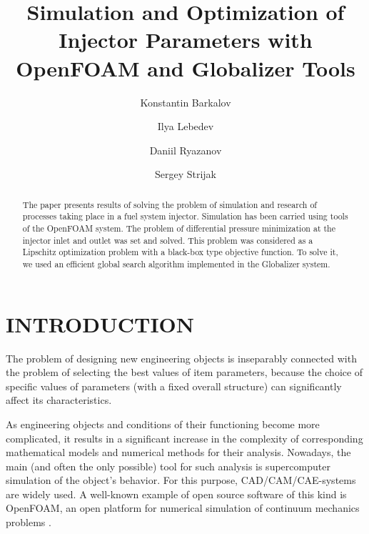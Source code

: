 \documentclass{aip-cp}
\begin{document}
\title{Simulation and Optimization of Injector Parameters with OpenFOAM and Globalizer Tools}

\author[aff1]{Konstantin Barkalov}
\author[aff1]{Ilya Lebedev}
\author[aff2]{Daniil Ryazanov}
\author[aff2]{Sergey Strijak}


\maketitle

\begin{abstract}
The paper presents results of solving the problem of simulation and research of processes taking place in a fuel system injector. Simulation has been carried using tools of the OpenFOAM system. The problem of differential pressure minimization at the injector inlet and outlet was set and solved. This problem was considered as a Lipschitz optimization problem with a black-box type objective function. To solve it, we used an efficient global search algorithm implemented in the Globalizer system.
\end{abstract}

\section{INTRODUCTION}

The problem of designing new engineering objects is inseparably connected with the problem of selecting the best values of item parameters, because the choice of specific values of parameters (with a fixed overall structure) can significantly affect its characteristics.

As engineering objects and conditions of their functioning become more complicated, it results in a significant increase in the complexity of corresponding mathematical models and numerical methods for their analysis. Nowadays, the main (and often the only possible) tool for such analysis is supercomputer simulation of the object's behavior. For this purpose, CAD/CAM/CAE-systems are widely used. A well-known example of open source software of this kind is OpenFOAM, an open platform for numerical simulation of continuum mechanics problems \cite{OpenFOAM}.
\end{document}
